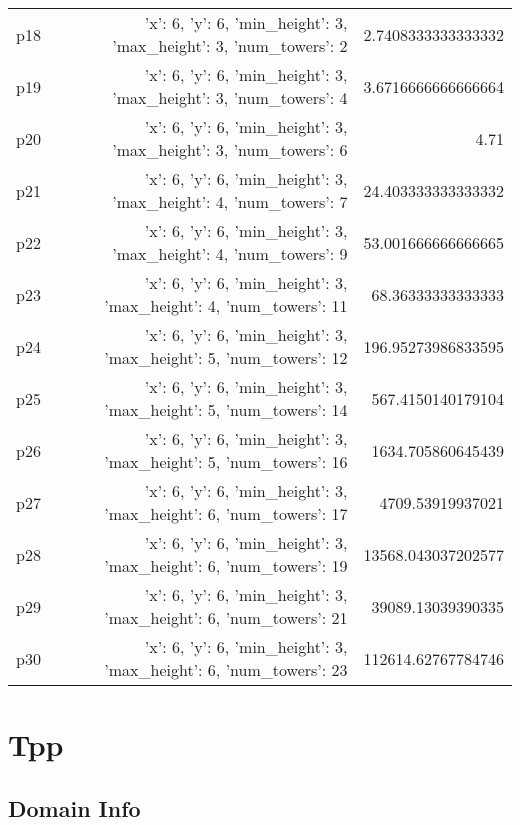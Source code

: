 \documentclass{article}
\begin{document}
\begin{center}
\begin{tabular}{r|r|r}
  p18&{'x': 6, 'y': 6, 'min\_height': 3, 'max\_height': 3, 'num\_towers': 2}&2.7408333333333332\\
  p19&{'x': 6, 'y': 6, 'min\_height': 3, 'max\_height': 3, 'num\_towers': 4}&3.6716666666666664\\
  p20&{'x': 6, 'y': 6, 'min\_height': 3, 'max\_height': 3, 'num\_towers': 6}&4.71\\
  p21&{'x': 6, 'y': 6, 'min\_height': 3, 'max\_height': 4, 'num\_towers': 7}&24.403333333333332\\
  p22&{'x': 6, 'y': 6, 'min\_height': 3, 'max\_height': 4, 'num\_towers': 9}&53.001666666666665\\
  p23&{'x': 6, 'y': 6, 'min\_height': 3, 'max\_height': 4, 'num\_towers': 11}&68.36333333333333\\
  p24&{'x': 6, 'y': 6, 'min\_height': 3, 'max\_height': 5, 'num\_towers': 12}&196.95273986833595\\
  p25&{'x': 6, 'y': 6, 'min\_height': 3, 'max\_height': 5, 'num\_towers': 14}&567.4150140179104\\
  p26&{'x': 6, 'y': 6, 'min\_height': 3, 'max\_height': 5, 'num\_towers': 16}&1634.705860645439\\
  p27&{'x': 6, 'y': 6, 'min\_height': 3, 'max\_height': 6, 'num\_towers': 17}&4709.53919937021\\
  p28&{'x': 6, 'y': 6, 'min\_height': 3, 'max\_height': 6, 'num\_towers': 19}&13568.043037202577\\
  p29&{'x': 6, 'y': 6, 'min\_height': 3, 'max\_height': 6, 'num\_towers': 21}&39089.13039390335\\
  p30&{'x': 6, 'y': 6, 'min\_height': 3, 'max\_height': 6, 'num\_towers': 23}&112614.62767784746
                            \end{tabular}
                            \end{center}
                    
                            \newpage \section{Tpp}
                    \subsection*{Domain Info}
\end{document}
